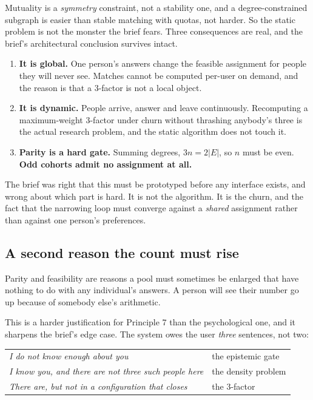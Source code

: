 \documentclass[11pt,a4paper]{article}
\begin{document}
Mutuality is a \emph{symmetry} constraint, not a stability one, and a
degree-constrained subgraph is easier than stable matching with quotas, not
harder. So the static problem is not the monster the brief fears. Three
consequences are real, and the brief's architectural conclusion survives intact.

\begin{enumerate}
\item \textbf{It is global.} One person's answers change the feasible assignment
  for people they will never see. Matches cannot be computed per-user on demand,
  and the reason is that a $3$-factor is not a local object.
\item \textbf{It is dynamic.} People arrive, answer and leave continuously.
  Recomputing a maximum-weight $3$-factor under churn without thrashing anybody's
  three is the actual research problem, and the static algorithm does not touch
  it.
\item \textbf{Parity is a hard gate.} Summing degrees, $3n = 2|E|$, so $n$ must
  be even. \textbf{Odd cohorts admit no assignment at all.}
\end{enumerate}

\begin{sectionbox}
The brief was right that this must be prototyped before any interface exists, and
wrong about which part is hard. It is not the algorithm. It is the churn, and the
fact that the narrowing loop must converge against a \emph{shared} assignment
rather than against one person's preferences.
\end{sectionbox}

\subsection{A second reason the count must rise}

Parity and feasibility are reasons a pool must sometimes be enlarged that have
nothing to do with any individual's answers. A person will see their number go up
because of somebody else's arithmetic.

This is a harder justification for Principle 7 than the psychological one, and it
sharpens the brief's edge case. The system owes the user \emph{three} sentences,
not two:

\begin{center}
\begin{tabular}{@{}ll@{}}
\toprule
\emph{I do not know enough about you} & the epistemic gate \\
\emph{I know you, and there are not three such people here} & the density problem \\
\emph{There are, but not in a configuration that closes} & the $3$-factor \\
\bottomrule
\end{tabular}
\end{center}
\end{document}
